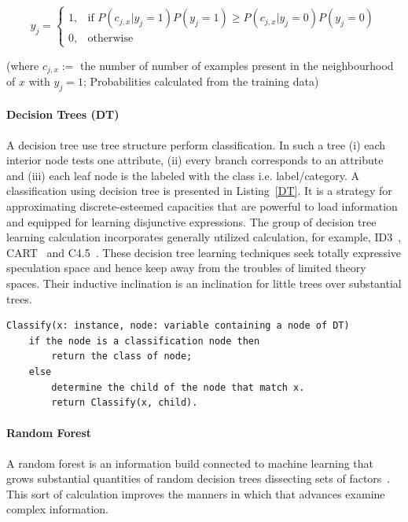 \begin{equation}
 y_{j} = 
\begin{cases}
    1, & \text{if } P(c_{j,x}|y_j = 1)P(y_j = 1) \geq P(c_{j,x}|y_j = 0)P(y_j = 0) \\
    0, & \text{otherwise}
\end{cases}
\end{equation}

(where $c_{j,x} :=$ the number of number of examples present in the neighbourhood of $x$ with $y_j = 1$; Probabilities calculated from the training data)

\paragraph{Decision Trees (DT)}
A decision tree use tree structure perform classification. In such a tree (i) each interior node tests one attribute, (ii) every branch corresponds to an attribute and (iii) each leaf node is the labeled with the class i.e. label/category. A classification using decision tree is presented in Listing~\ref{DT}. It is a strategy for approximating discrete-esteemed capacities that are powerful to load information and equipped for learning disjunctive expressions. The group of decision tree learning calculation incorporates generally utilized calculation, for example, ID3~\cite{quinlan1986induction}, CART~\cite{breiman2017classification} and C4.5~\cite{xiaoliang2009research}. These decision tree learning techniques seek totally expressive speculation space and hence keep away from the troubles of limited theory spaces. Their inductive inclination is an inclination for little trees over substantial trees. 
\begin{lstlisting}[caption = Classification with Decision Trees, label = DT]
Classify(x: instance, node: variable containing a node of DT)
    if the node is a classification node then
        return the class of node;
    else
        determine the child of the node that match x.
        return Classify(x, child).

\end{lstlisting}



\paragraph{Random Forest}
A random forest is an information build connected to machine learning that grows substantial quantities of random decision trees dissecting sets of factors~\cite{breiman2001random}. This sort of calculation improves the manners in which that advances examine complex information. 

